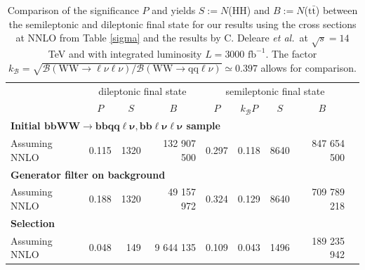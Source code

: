 \documentclass[10pt,a4paper]{article}
\newcommand{\cc}[1]{\multicolumn{1}{c}{#1}} %
\newcommand{\level}[1]{ \multicolumn{5}{l}{\hspace{-1em}\textbf{#1}}}
\newcommand{\T}{\rule{0pt}{2.9ex}}       %
\renewcommand{\tt}{$\text{t}\bar{\text{t}}$}
\newcommand{\lnu}{$\ell\nu$}
\newcommand{\sAN}{$\sigma_1$}
\newcommand{\BR}{\mathcal{B}}
\newcommand{\etal}{\emph{et al.}}
\begin{document}
\begin{table}[t]
	\centering
	\caption{Comparison of the significance $P$ and yields $S:=N$(HH) and $B:=N$(\tt) between the semileptonic and dileptonic final state for our results using the cross sections at NNLO from Table \ref{sigma} and the results by C. Deleare \etal\ at $\sqrt{s}=14$ TeV and with integrated luminosity $L = 3000 \text{ fb}^{-1}$. The factor $k_{\BR}=\sqrt{\BR(\text{WW}\rightarrow\text{\lnu\lnu})/\BR(\text{WW}\rightarrow\text{qq\lnu})} \simeq 0.397$ allows for comparison.} \vspace{5pt}  %
	\label{comparison}
	\begin{tabular}{@{\quad}llrrllrrr@{}}
	
	\toprule
	& \multicolumn{3}{c}{dileptonic final state} & \multicolumn{4}{c}{semileptonic final state} \\
	\cmidrule(r){2-4} \cmidrule(r){5-8}
	                       & \cc{$P$} & \cc{$S$} & \cc{$B$} & \cc{$P$} & \cc{$k_{\BR}P$} & \cc{$S$} & \cc{$B$} \\
	\midrule
	\level{Initial $\bm{\text{bbWW} \rightarrow \text{bb}qq\ell\nu, \text{bb}\ell\nu\ell\nu}$ sample} \T\\
	Assuming NNLO          & 0.115 &   1320  & 132 907 500 & 0.297 & 0.118 &   8640  & 847 654 500  \\
	\level{Generator filter on background} \T\\
	Assuming NNLO          & 0.188 &   1320  &  49 157 972 & 0.324 & 0.129 &   8640  & 709 789 218  \\
	\level{Selection} \T\\
 	Assuming NNLO          & 0.048 &    149  &   9 644 135 & 0.109 & 0.043 &   1496  & 189 235 942  \\

\end{tabular}
\end{table}
\end{document}
